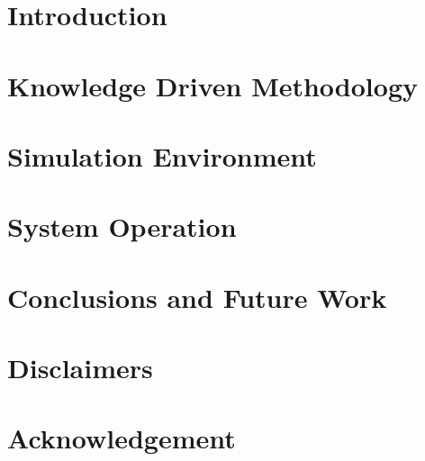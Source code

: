 \documentclass{llncs}
\begin{document}
%
%

\section{Introduction}

\section{Knowledge Driven Methodology}\label{section:architecture}


\section{Simulation Environment}\label{section:simulation}


%
\section{System Operation}\label{section:sensor}


\section{Conclusions and Future Work}\label{section:conclusions}


\section*{Disclaimers}

\section*{Acknowledgement}

%
%


\clearpage
{} %
\renewcommand{\indexname}{Author Index}
\printindex
\clearpage
{} %
\renewcommand{\indexname}{Subject Index}

\end{document}
